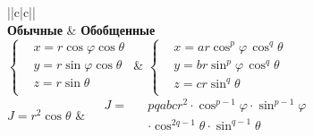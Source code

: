 \begin{tabu}[t]{||c|c||}
	\hline
		 \\
	\hline
		\textbf{Обычные} &
		\textbf{Обобщенные} \\
	\hline
	\hline
		$\displaystyle \left\{\begin{aligned}
			&x = r\cos \varphi \cos \theta \\
			&y = r\sin \varphi \cos \theta \\
			&z = r\sin \theta \\
		\end{aligned}\right.$ &
		$\displaystyle \left\{\begin{aligned}
			&x = ar\cos^p \varphi\, \cos^q \theta \\
			&y = br\sin^p \varphi\, \cos^q \theta \\
			&z = cr\sin^q \theta \\
		\end{aligned}\right.$ \\
	\hline
		$\displaystyle J = r^2\cos \theta $ &
		$\displaystyle \begin{aligned}
			&J = &&pqabcr^2\cdot\cos^{p-1}\varphi\cdot\sin^{p-1}\varphi \\
			& &&\cdot\cos^{2q-1}\theta\cdot\sin^{q-1}\theta \\
		\end{aligned} $ \\
	\hline
		 \\
	\hline
\end{tabu}

